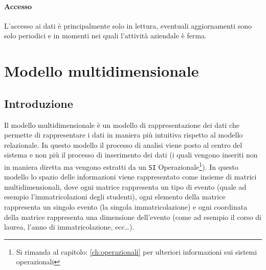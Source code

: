         \paragraph{Accesso} L'accesso ai dati è principalmente solo in lettura, eventuali aggiornamenti sono solo periodici e in momenti nei quali l'attività aziendale è ferma.
\section{Modello multidimensionale}
    \subsection{Introduzione}
        Il modello multidimensionale è un modello di rappresentazione dei dati che permette di rappresentare i dati in maniera più intuitiva rispetto al modello relazionale. In questo modello il processo di analisi viene posto al centro del sistema e non più il processo di inserimento dei dati (i quali vengono inseriti non in maniera diretta ma vengono estratti da un \texttt{SI} Operazionale\footnote{Si rimanda al capitolo: \ref{ch:operazionali}  per ulteriori informazioni sui sistemi operazionali}).
        In questo modello lo spazio delle informazioni viene rappresentato come insieme di matrici multidimensionali, dove ogni matrice rappresenta un tipo di evento (quale ad esempio l'immatricolazioni degli studenti), ogni elemento della matrice rappresenta un singolo evento (la singola immatricolazione) e ogni coordinata della matrice rappresenta una dimensione dell'evento (come ad esempio il corso di laurea, l'anno di immatricolazione, ecc\dots).